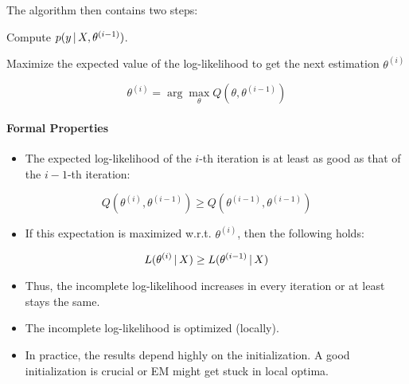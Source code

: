 					The algorithm then contains two steps:
					\begin{description}[leftmargin = 5cm]
						\item[E-Step (Expectation)] Compute \( p(y \,\vert\, X, \theta^{(i - 1)}) \).
						\item[M-Step (Maximization)] Maximize the expected value of the log-likelihood to get the next estimation \( \theta^{(i)} \)
					\end{description}
					\begin{equation}
						\theta^{(i)} = \arg\max\limits_\theta Q(\theta, \theta^{(i - 1)})
					\end{equation}

				\paragraph{Formal Properties}
					\begin{itemize}
						\item The expected log-likelihood of the \(i\)-th iteration is at least as good as that of the \(i - 1\)-th iteration:
					\end{itemize}
					\begin{equation}
						Q(\theta^{(i)}, \theta^{(i - 1)}) \geq Q(\theta^{(i - 1)}, \theta^{(i - 1)})
					\end{equation}
					\begin{itemize}
						\item If this expectation is maximized w.r.t. \(\theta^{(i)}\), then the following holds:
					\end{itemize}
					\begin{equation}
						L(\theta^{(i)} \,\vert\, X) \geq L(\theta^{(i - 1)} \,\vert\, X)
					\end{equation}
					\begin{itemize}
						\item Thus, the incomplete log-likelihood increases in every iteration or at least stays the same.
						\item The incomplete log-likelihood is optimized (locally).
						\item In practice, the results depend highly on the initialization. A good initialization is crucial or EM might get stuck in local optima.
					\end{itemize}

